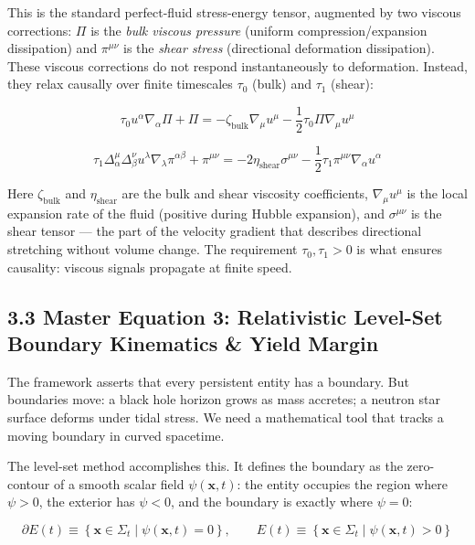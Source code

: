 \documentclass[11pt,a4paper]{article}
\theoremstyle{definition}\newtheorem{definition}{Definition}
\theoremstyle{remark}\newtheorem{remark}{Remark}
\begin{document}
This is the standard perfect-fluid stress-energy tensor, augmented by two viscous corrections: $\Pi$ is the \textit{bulk viscous pressure} (uniform compression/expansion dissipation) and $\pi^{\mu\nu}$ is the \textit{shear stress} (directional deformation dissipation). These viscous corrections do not respond instantaneously to deformation. Instead, they relax causally over finite timescales $\tau_0$ (bulk) and $\tau_1$ (shear):


\begin{equation}
\boxed{\tau_0 u^\alpha \nabla_\alpha \Pi + \Pi = -\zeta_{\text{bulk}} \nabla_\mu u^\mu - \frac{1}{2} \tau_0 \Pi \nabla_\mu u^\mu}
\end{equation}



\begin{equation}
\boxed{\tau_1 \Delta^\mu_\alpha \Delta^\nu_\beta u^\lambda \nabla_\lambda \pi^{\alpha\beta} + \pi^{\mu\nu} = -2 \eta_{\text{shear}} \sigma^{\mu\nu} - \frac{1}{2} \tau_1 \pi^{\mu\nu} \nabla_\alpha u^\alpha}
\end{equation}


Here $\zeta_{\text{bulk}}$ and $\eta_{\text{shear}}$ are the bulk and shear viscosity coefficients, $\nabla_\mu u^\mu$ is the local expansion rate of the fluid (positive during Hubble expansion), and $\sigma^{\mu\nu}$ is the shear tensor — the part of the velocity gradient that describes directional stretching without volume change. The requirement $\tau_0, \tau_1 > 0$ is what ensures causality: viscous signals propagate at finite speed.
\subsection{3.3 Master Equation 3: Relativistic Level-Set Boundary Kinematics \& Yield Margin}

The framework asserts that every persistent entity has a boundary. But boundaries move: a black hole horizon grows as mass accretes; a neutron star surface deforms under tidal stress. We need a mathematical tool that tracks a moving boundary in curved spacetime.

The level-set method accomplishes this. It defines the boundary as the zero-contour of a smooth scalar field $\psi(\mathbf{x}, t)$: the entity occupies the region where $\psi > 0$, the exterior has $\psi < 0$, and the boundary is exactly where $\psi = 0$:


\begin{equation}
\partial E(t) \equiv \left\{ \mathbf{x} \in \Sigma_t \mid \psi(\mathbf{x}, t) = 0 \right\}, \qquad E(t) \equiv \left\{ \mathbf{x} \in \Sigma_t \mid \psi(\mathbf{x}, t) > 0 \right\}
\end{equation}
\end{document}
